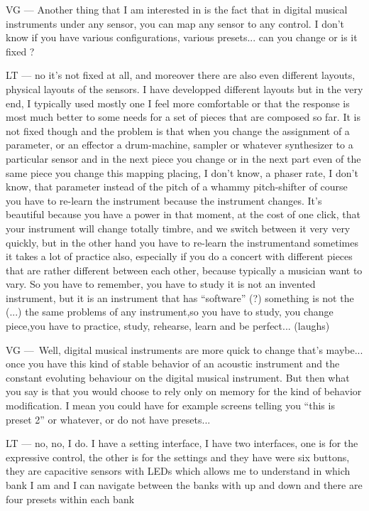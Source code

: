 VG — Another thing that I am interested in is the fact that in digital musical instruments under any sensor, you can map any sensor to any control. I don't know if you have various configurations, various presets... can you change or is it fixed ?

LT — no it's not fixed at all, and moreover there are also even different layouts, physical layouts of the sensors. I have developped different layouts but in the very end, I typically used mostly one I feel more comfortable or that the response is most much better to some needs for a set of pieces that are composed so far. It is not fixed though and the problem is that when you change the assignment of a parameter, or an effector a drum-machine, sampler or whatever synthesizer to a particular sensor and in the next piece you change or in the next part even of the same piece you change this mapping placing, I don't know, a phaser rate, I don't know, that parameter instead of the pitch of a whammy pitch-shifter of course you have to re-learn the instrument because the instrument changes. It's beautiful because you have a power in that moment, at the cost of one click, that your instrument will change totally timbre, and we switch between it very very quickly, but in the other hand you have to re-learn the instrumentand sometimes it takes a lot of practice also, especially if you do a concert with different pieces that are rather different between each other, because typically a musician want to vary. So you have to remember, you have to study it is not an invented instrument, but it is an instrument that has ``software'' (?) something is not the (...) the same problems of any instrument,so you have to study, you change piece,you have to practice, study, rehearse, learn and be perfect... (laughs)

VG — Well, digital musical instruments are more quick to change that's maybe... once you have this kind of stable behavior of an acoustic instrument and the constant evoluting behaviour on the digital musical instrument. But then what you say is that you would choose to rely only on memory for the kind of behavior modification. I mean you could have for example screens telling you ``this is preset 2'' or whatever, or do not have presets...

LT — no, no, I do. I have a setting interface, I have two interfaces, one is for the expressive control, the other is for the settings and they have were six buttons, they are capacitive sensors with LEDs which allows me to understand in which bank I am and I can navigate between the banks with up and down and there are four presets within each bank

